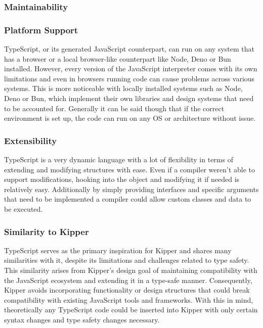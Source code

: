 \subsubsection{Maintainability}

\subsubsection{Platform Support}

TypeScript, or its generated JavaScript counterpart, can run on any system that has a browser or a local browser-like counterpart like Node, Deno or Bun installed. However, every version of the JavaScript interpreter comes with its own limitations and even in browsers running code can cause problems across various systems. This is more noticeable with locally installed systems such as Node, Deno or Bun, which implement their own libraries and design systems that need to be accounted for. Generally it can be said though that if the correct environment is set up, the code can run on any OS or architecture without issue.

\subsubsection{Extensibility}

TypeScript is a very dynamic language with a lot of flexibility in terms of extending and modifying structures with ease. Even if a compiler weren't able to support modifications, hooking into the object and modifying it if needed is relatively easy. Additionally by simply providing interfaces and specific arguments that need to be implemented a compiler could allow custom classes and data to be executed.

\subsubsection{Similarity to Kipper}

TypeScript serves as the primary inspiration for Kipper and shares many similarities with it, despite its limitations and challenges related to type safety. This similarity arises from Kipper's design goal of maintaining compatibility with the JavaScript ecosystem and extending it in a type-safe manner. Consequently, Kipper avoids incorporating functionality or design structures that could break compatibility with existing JavaScript tools and frameworks. With this in mind, theoretically any TypeScript code could be inserted into Kipper with only certain syntax changes and type safety changes necessary.

